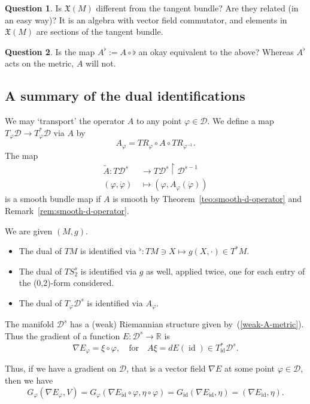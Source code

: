 \documentclass[a5paper,10pt,twoside]{article}
\newcommand{\R}{\ensuremath{\mathbb{R}}}
\newcommand{\cD}{\ensuremath{\mathcal{D}}}
\DeclareMathOperator*{\id}{id}
\theoremstyle{plain}
\theoremstyle{definition}
\newtheorem{question}{Question}
\theoremstyle{remark}
\begin{document}
\begin{question}
Is $\mathfrak{X}(M)$ different from the tangent bundle? Are they related (in an easy way)? It is an algebra with vector field commutator, and elements in  $\mathfrak{X}(M)$ are sections of the tangent bundle.
\end{question}

\begin{question}
Is the map  $A^\flat:=A\circ\flat$ an okay equivalent to the above? Whereas $A^\flat$ acts on the metric, $A$ will not.
\end{question}

\subsection{A summary of the dual identifications}
We may `transport' the operator $A$ to any point $\varphi\in\cD$. We define a map $T_\varphi\cD\to T_\varphi^*\cD$ via $A$ by
%
\begin{equation}
A_\varphi = TR_{\varphi}\circ A\circ TR_{\varphi^{-1}}.
\end{equation}
%
The map
%
\begin{align}
\tilde{A}:T\cD^s\,&\to T\cD^s\upharpoonright\cD^{s-1} \nonumber \\
(\varphi,\dot{\varphi})\,&\mapsto (\varphi,A_\varphi(\dot{\varphi}))
\end{align}
%
is a smooth bundle map if $A$ is smooth by Theorem~\ref{teo:smooth-d-operator} and Remark~\ref{rem:smooth-d-operator}.

We are given $(M,g)$.
\begin{itemize}
	\item The dual of $TM$ is identified via $^\flat:TM\ni X\mapsto g(X,\cdot)\in T^*M.$
	\item The dual of $TS_2^s$ is identified via $g$ as well, applied twice, one for each entry of the (0,2)-form considered.
	\item The dual of $T_\varphi\cD^s$ is identified via $A_\varphi$.
\end{itemize}



The manifold $\cD^s$ has a (weak) Riemannian structure given by~(\ref{weak-A-metric}). Thus the gradient of a function $E:\cD^s\to\R$ is
%
\begin{equation}
\nabla E_\varphi =\xi\circ\varphi,\quad \mathrm{for}\quad A\xi=dE(\id)\in T^*_{\id}\cD^s.
\end{equation}
%

Thus, if we have a gradient on $\cD$, that is a vector field $\nabla E$ at some point $\varphi\in\cD$, then we have
%
\begin{equation}
G_\varphi(\nabla E_\varphi,V)=G_{\varphi}(\nabla E_{\id}\circ\varphi,\eta\circ\varphi)=G_{\id}(\nabla E_{\id},\eta)=(\nabla E_{\id},\eta).
\end{equation}
\end{document}
